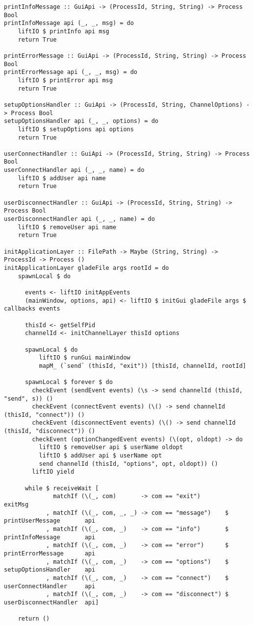 \documentclass[russian,utf8,simple,emptystyle]{eskdtext}
\begin{document}
\begin{lstlisting}
printInfoMessage :: GuiApi -> (ProcessId, String, String) -> Process Bool
printInfoMessage api (_, _, msg) = do 
    liftIO $ printInfo api msg 
    return True

printErrorMessage :: GuiApi -> (ProcessId, String, String) -> Process Bool
printErrorMessage api (_, _, msg) = do 
    liftIO $ printError api msg 
    return True

setupOptionsHandler :: GuiApi -> (ProcessId, String, ChannelOptions) -> Process Bool
setupOptionsHandler api (_, _, options) = do 
    liftIO $ setupOptions api options 
    return True 

userConnectHandler :: GuiApi -> (ProcessId, String, String) -> Process Bool
userConnectHandler api (_, _, name) = do 
    liftIO $ addUser api name
    return True 

userDisconnectHandler :: GuiApi -> (ProcessId, String, String) -> Process Bool
userDisconnectHandler api (_, _, name) = do 
    liftIO $ removeUser api name
    return True 
    
initApplicationLayer :: FilePath -> Maybe (String, String) -> ProcessId -> Process ()
initApplicationLayer gladeFile args rootId = do 
    spawnLocal $ do

      events <- liftIO initAppEvents
      (mainWindow, options, api) <- liftIO $ initGui gladeFile args $ callbacks events
        
      thisId <- getSelfPid
      channelId <- initChannelLayer thisId options
      
      spawnLocal $ do
          liftIO $ runGui mainWindow
          mapM_ (`send` (thisId, "exit")) [thisId, channelId, rootId]
      
      spawnLocal $ forever $ do 
        checkEvent (sendEvent events) (\s -> send channelId (thisId, "send", s)) ()
        checkEvent (connectEvent events) (\() -> send channelId (thisId, "connect")) ()
        checkEvent (disconnectEvent events) (\() -> send channelId (thisId, "disconnect")) ()
        checkEvent (optionChangedEvent events) (\(opt, oldopt) -> do
          liftIO $ removeUser api $ userName oldopt
          liftIO $ addUser api $ userName opt
          send channelId (thisId, "options", opt, oldopt)) ()
        liftIO yield

      while $ receiveWait [
              matchIf (\(_, com)       -> com == "exit")         exitMsg
            , matchIf (\(_, com, _, _) -> com == "message")    $ printUserMessage       api
            , matchIf (\(_, com, _)    -> com == "info")       $ printInfoMessage       api
            , matchIf (\(_, com, _)    -> com == "error")      $ printErrorMessage      api
            , matchIf (\(_, com, _)    -> com == "options")    $ setupOptionsHandler    api
            , matchIf (\(_, com, _)    -> com == "connect")    $ userConnectHandler     api
            , matchIf (\(_, com, _)    -> com == "disconnect") $ userDisconnectHandler  api]

    return ()
\end{lstlisting}
\end{document}
